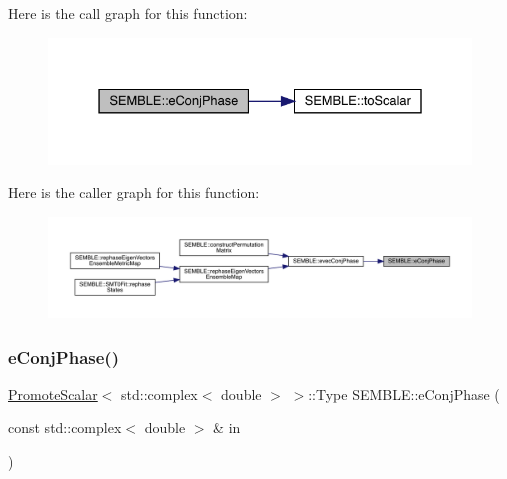Here is the call graph for this function\+:
\nopagebreak
\begin{figure}[H]
\begin{center}
\leavevmode
\includegraphics[width=331pt]{d7/dfd/namespaceSEMBLE_a58b3ad4ba97955f042eae4be16a29b21_cgraph}
\end{center}
\end{figure}
Here is the caller graph for this function\+:
\nopagebreak
\begin{figure}[H]
\begin{center}
\leavevmode
\includegraphics[width=350pt]{d7/dfd/namespaceSEMBLE_a58b3ad4ba97955f042eae4be16a29b21_icgraph}
\end{center}
\end{figure}
\mbox{\label{namespaceSEMBLE_aab16747d17287c71280164a3a824f77f}} 
\subsubsection{\texorpdfstring{eConjPhase()}{eConjPhase()}\hspace{0.1cm}{\footnotesize\ttfamily [2/2]}}
{\footnotesize\ttfamily \mbox{\hyperlink{structSEMBLE_1_1PromoteScalar}{Promote\+Scalar}}$<$ std\+::complex$<$ double $>$ $>$\+::Type S\+E\+M\+B\+L\+E\+::e\+Conj\+Phase (\begin{DoxyParamCaption}\item[{const std\+::complex$<$ double $>$ \&}]{in }\end{DoxyParamCaption})}

